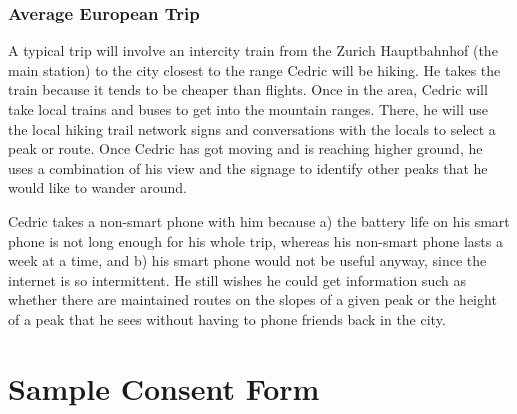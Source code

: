 \documentclass[authoryearcitations]{UoYCSproject}
\begin{document}
\subsection{Average European Trip}
A typical trip will involve an intercity train from the Zurich Hauptbahnhof (the main station) to the city closest to the range Cedric will be hiking.  He takes the train because it tends to be cheaper than flights.  Once in the area, Cedric will take local trains and buses to get into the mountain ranges.  There, he will use the local hiking trail network signs and conversations with the locals to select a peak or route.  Once Cedric has got moving and is reaching higher ground, he uses a combination of his view and the signage to identify other peaks that he would like to wander around.  

Cedric takes a non-smart phone with him because a) the battery life on his smart phone is not long enough for his whole trip, whereas his non-smart phone lasts a week at a time, and b) his smart phone would not be useful anyway, since the internet is so intermittent.  He still wishes he could get information such as whether there are maintained routes on the slopes of a given peak or the height of a peak that he sees without having to phone friends back in the city.
\newpage

\chapter{Sample Consent Form}
\label{sec:appendixConsentForm}
\newpage
\end{document}
